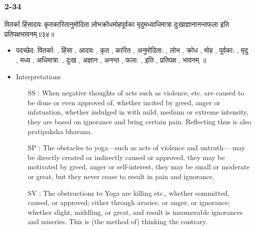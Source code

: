 \begin{frame}[fragile]\frametitle{2-34}
\begin{sanskrit}
वितर्का हिंसादयः कृतकारितानुमोदिता लोभक्रोधमोहपूर्वका मृदुमध्याधिमात्रा दुःखाज्ञानानन्तफला इति प्रतिपक्षभावनम्॥३४॥
\end{sanskrit}

	\begin{itemize}
	\item पदच्छेद: वितर्का: , हिंसा , आदयः , कृत , कारित , अनुमोदिता: , लोभ , क्रोध , मोह , पूर्वका: , मृदु , मध्य , अधिमात्रा: , दुःख , अज्ञान , अनन्त , फला: , इति , प्रतिपक्ष , भावनम् ॥
	\item Interpretations
		\begin{itemize}

		\item [SS]: When negative thoughts of acts such as violence, etc. are caused to be done or even approved of, whether incited by greed, anger or infatuation, whether indulged in with mild, medium or extreme intensity, they are based on ignorance and bring certain pain. Reflecting thus is also pratipaksha bhavana.
		\item [SP]: The obstacles to yoga—such as acts of violence and untruth— may be directly created or indirectly caused or approved, they may be motivated by greed, anger or self-interest, they may be small or moderate or great, but they never cease to result in pain and ignorance.
		\item [SV]: The obstructions to Yoga are killing etc., whether committed, caused, or approved; either through avarice, or anger, or ignorance; whether slight, middling, or great, and result is innumerable ignorances and miseries. This is (the method of) thinking the contrary. 
		\end{itemize}
	\end{itemize}	
\end{frame}

